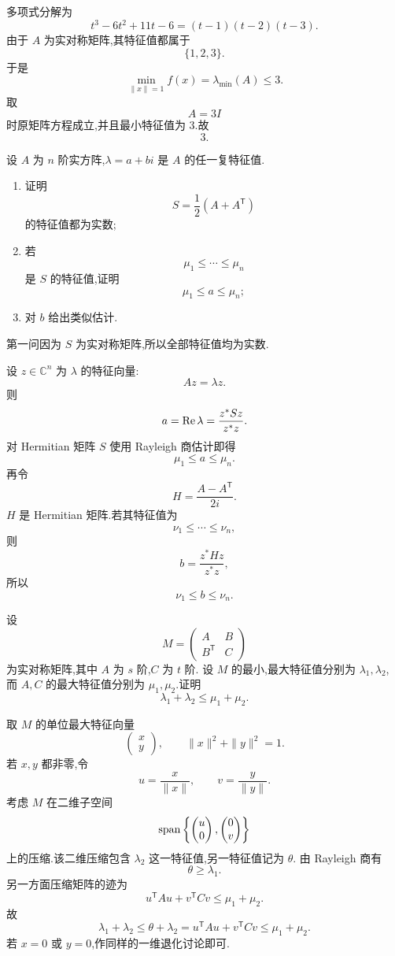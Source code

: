 \begin{solution}
多项式分解为
\[
t^3-6t^2+11t-6
=
(t-1)(t-2)(t-3).
\]
由于 $A$ 为实对称矩阵,其特征值都属于
\[
\{1,2,3\}.
\]
于是
\[
\min_{\|x\|=1}f(x)
=
\lambda_{\min}(A)
\le3.
\]
取
\[
A=3I
\]
时原矩阵方程成立,并且最小特征值为 $3$.故
\[
\boxed{3}.
\]
\end{solution}


\begin{example}
设 $A$ 为 $n$ 阶实方阵,$\lambda=a+bi$ 是 $A$ 的任一复特征值.
\begin{enumerate}
    \item 证明
    \[
    S=\dfrac12(A+A^{\mathsf T})
    \]
    的特征值都为实数;
    \item 若
    \[
    \mu_1\le\cdots\le\mu_n
    \]
    是 $S$ 的特征值,证明
    \[
    \mu_1\le a\le\mu_n;
    \]
    \item 对 $b$ 给出类似估计.
\end{enumerate}
\end{example}
\exampleblank

\begin{solution}
第一问因为 $S$ 为实对称矩阵,所以全部特征值均为实数.

设 $z\in\mathbb{C}^n$ 为 $\lambda$ 的特征向量:
\[
Az=\lambda z.
\]
则
\[
a
=
\operatorname{Re}\lambda
=
\dfrac{z^*Sz}{z^*z}.
\]
对 Hermitian 矩阵 $S$ 使用 Rayleigh 商估计即得
\[
\mu_1\le a\le\mu_n.
\]
再令
\[
H=\dfrac{A-A^{\mathsf T}}{2i}.
\]
$H$ 是 Hermitian 矩阵.若其特征值为
\[
\nu_1\le\cdots\le\nu_n,
\]
则
\[
b
=
\dfrac{z^*Hz}{z^*z},
\]
所以
\[
\boxed{\nu_1\le b\le\nu_n}.
\]
\end{solution}


\begin{example}
设
\[
M=
\begin{pmatrix}
A&B\\
B^{\mathsf T}&C
\end{pmatrix}
\]
为实对称矩阵,其中 $A$ 为 $s$ 阶,$C$ 为 $t$ 阶.
设 $M$ 的最小,最大特征值分别为 $\lambda_1,\lambda_2$,
而 $A,C$ 的最大特征值分别为 $\mu_1,\mu_2$.证明
\[
\lambda_1+\lambda_2\le\mu_1+\mu_2.
\]
\end{example}
\exampleblank

\begin{solution}
取 $M$ 的单位最大特征向量
\[
\begin{pmatrix}x\\y\end{pmatrix},
\qquad
\|x\|^2+\|y\|^2=1.
\]
若 $x,y$ 都非零,令
\[
u=\dfrac{x}{\|x\|},
\qquad
v=\dfrac{y}{\|y\|}.
\]
考虑 $M$ 在二维子空间
\[
\operatorname{span}\left\{
\begin{pmatrix}u\\0\end{pmatrix},
\begin{pmatrix}0\\v\end{pmatrix}
\right\}
\]
上的压缩.该二维压缩包含 $\lambda_2$ 这一特征值,另一特征值记为 $\theta$.
由 Rayleigh 商有
\[
\theta\ge\lambda_1.
\]
另一方面压缩矩阵的迹为
\[
u^{\mathsf T}Au+v^{\mathsf T}Cv
\le\mu_1+\mu_2.
\]
故
\[
\lambda_1+\lambda_2
\le
\theta+\lambda_2
=
u^{\mathsf T}Au+v^{\mathsf T}Cv
\le
\mu_1+\mu_2.
\]
若 $x=0$ 或 $y=0$,作同样的一维退化讨论即可.
\end{solution}


